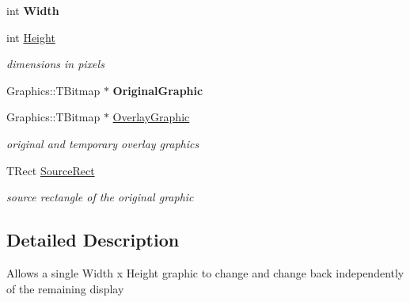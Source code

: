 \begin{DoxyCompactItemize}
\mbox{\label{class_t_graphic_element_a5449d46461dbf9108441020cdd00c0ae}} 
int {\bfseries Width}
\item 
\mbox{\label{class_t_graphic_element_aa7e2feb822e3a00228b582e0c8b6d277}} 
int \mbox{\hyperlink{class_t_graphic_element_aa7e2feb822e3a00228b582e0c8b6d277}{Height}}
\begin{DoxyCompactList}\small\item\em dimensions in pixels \end{DoxyCompactList}\item 
\mbox{\label{class_t_graphic_element_a5de04c4143742c4247e4015dc7554fad}} 
Graphics\+::\+T\+Bitmap $\ast$ {\bfseries Original\+Graphic}
\item 
\mbox{\label{class_t_graphic_element_a129fc709d76f28924aa71d2f8ba1ecc7}} 
Graphics\+::\+T\+Bitmap $\ast$ \mbox{\hyperlink{class_t_graphic_element_a129fc709d76f28924aa71d2f8ba1ecc7}{Overlay\+Graphic}}
\begin{DoxyCompactList}\small\item\em original and temporary overlay graphics \end{DoxyCompactList}\item 
\mbox{\label{class_t_graphic_element_af4a75f077eac76c1f14c66571ff2f3b3}} 
T\+Rect \mbox{\hyperlink{class_t_graphic_element_af4a75f077eac76c1f14c66571ff2f3b3}{Source\+Rect}}
\begin{DoxyCompactList}\small\item\em source rectangle of the original graphic \end{DoxyCompactList}\end{DoxyCompactItemize}


\subsection{Detailed Description}
Allows a single Width x Height graphic to change and change back independently of the remaining display

